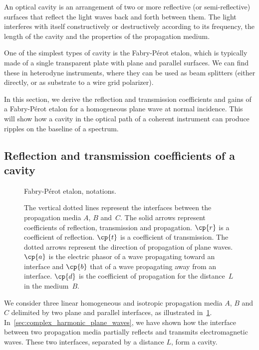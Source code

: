 An optical cavity is an arrangement of two or more reflective (or semi-reflective) surfaces that reflect the light waves back and forth between them.
The light interferes with itself constructively or destructively according to its frequency, the length of the cavity and the properties of the propagation medium.

One of the simplest types of cavity is the Fabry-Pérot etalon, which is typically made of a single transparent plate with plane and parallel surfaces.
We can find these in heterodyne instruments, where they can be used as beam splitters (either directly, or as substrate to a wire grid polarizer).

In this section, we derive the reflection and transmission coefficients and gains of a Fabry-Pérot etalon for a homogeneous plane wave at normal incidence.
This will show how a cavity in the optical path of a coherent instrument can produce ripples on the baseline of a spectrum.




\subsection{Reflection and transmission coefficients of a cavity}

\begin{figure}[hbtp]
    \centering
    
    \caption{Fabry-Pérot etalon, notations.}
    \caption*{
       The vertical dotted lines represent the interfaces between the propagation media $A$, $B$ and~$C$.
       The solid arrows represent coefficients of reflection, transmission and propagation.
       $\cp{r}$ is a coefficient of reflection.
       $\cp{t}$ is a coefficient of transmission.
       The dotted arrows represent the direction of propagation of plane waves.
       $\cp{a}$ is the electric phasor of a wave propagating toward an interface and
       $\cp{b}$ that of a wave propagating away from an interface.
       $\cp{d}$ is the coefficient of propagation for the distance~$L$ in the medium~$B$.
    }
    \label{fig:cavity_notations}
\end{figure}

We consider three linear homogeneous and isotropic propagation media $A$, $B$ and $C$
delimited by two plane and parallel interfaces, as illustrated in~\cref{fig:cavity_notations}.
In~\cref{sec:complex_harmonic_plane_waves}, we have shown how the interface between two propagation media partially reflects and transmits electromagnetic waves.
These two interfaces, separated by a distance $L$, form a cavity.

